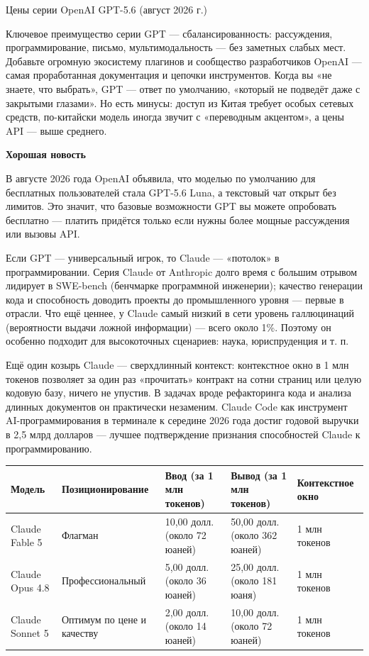 \begin{center}\small\color{gray}Цены серии OpenAI GPT-5.6 (август 2026 г.)\end{center}

Ключевое преимущество серии GPT — сбалансированность: рассуждения, программирование, письмо, мультимодальность — без заметных слабых мест. Добавьте огромную экосистему плагинов и сообщество разработчиков OpenAI — самая проработанная документация и цепочки инструментов. Когда вы «не знаете, что выбрать», GPT — ответ по умолчанию, «который не подведёт даже с закрытыми глазами». Но есть минусы: доступ из Китая требует особых сетевых средств, по-китайски модель иногда звучит с «переводным акцентом», а цены API — выше среднего.

\textbf{Хорошая новость}\par

В августе 2026 года OpenAI объявила, что моделью по умолчанию для бесплатных пользователей стала GPT-5.6 Luna, а текстовый чат открыт без лимитов. Это значит, что базовые возможности GPT вы можете опробовать бесплатно — платить придётся только если нужны более мощные рассуждения или вызовы API.


Если GPT — универсальный игрок, то Claude — «потолок» в программировании. Серия Claude от Anthropic долго время с большим отрывом лидирует в SWE-bench (бенчмарке программной инженерии); качество генерации кода и способность доводить проекты до промышленного уровня — первые в отрасли. Что ещё ценнее, у Claude самый низкий в сети уровень галлюцинаций (вероятности выдачи ложной информации) — всего около 1\%. Поэтому он особенно подходит для высокоточных сценариев: наука, юриспруденция и т. п.

Ещё один козырь Claude — сверхдлинный контекст: контекстное окно в 1 млн токенов позволяет за один раз «прочитать» контракт на сотни страниц или целую кодовую базу, ничего не упустив. В задачах вроде рефакторинга кода и анализа длинных документов он практически незаменим. Claude Code как инструмент AI-программирования в терминале к середине 2026 года достиг годовой выручки в 2,5 млрд долларов — лучшее подтверждение признания способностей Claude к программированию.

\begin{center}
\begin{tabularx}{\linewidth}{|X|X|X|X|X|}
\hline
\textbf{Модель} & \textbf{Позиционирование} & \textbf{Ввод (за 1 млн токенов)} & \textbf{Вывод (за 1 млн токенов)} & \textbf{Контекстное окно} \tabularnewline
\hline
Claude Fable 5 & Флагман & 10,00 долл. (около 72 юаней) & 50,00 долл. (около 362 юаней) & 1 млн токенов \tabularnewline
Claude Opus 4.8 & Профессиональный & 5,00 долл. (около 36 юаней) & 25,00 долл. (около 181 юаня) & 1 млн токенов \tabularnewline
Claude Sonnet 5 & Оптимум по цене и качеству & 2,00 долл. (около 14 юаней) & 10,00 долл. (около 72 юаней) & 1 млн токенов \tabularnewline
\hline
\end{tabularx}
\end{center}


